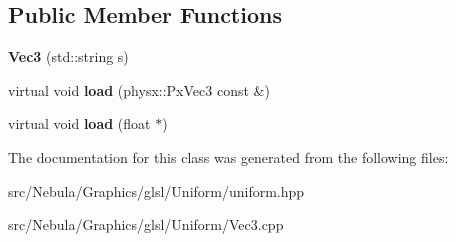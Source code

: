 \subsection*{\-Public \-Member \-Functions}
\begin{DoxyCompactItemize}
\item 
\hypertarget{classNeb_1_1glsl_1_1Uniform_1_1Scalar_1_1Vec3_a00e17308113063b4413ea425ddf975ad}{{\bfseries \-Vec3} (std\-::string s)}\label{classNeb_1_1glsl_1_1Uniform_1_1Scalar_1_1Vec3_a00e17308113063b4413ea425ddf975ad}

\item 
\hypertarget{classNeb_1_1glsl_1_1Uniform_1_1Scalar_1_1Vec3_a5713aa74fb8e57849ce10f0f9ecf51b2}{virtual void {\bfseries load} (physx\-::\-Px\-Vec3 const \&)}\label{classNeb_1_1glsl_1_1Uniform_1_1Scalar_1_1Vec3_a5713aa74fb8e57849ce10f0f9ecf51b2}

\item 
\hypertarget{classNeb_1_1glsl_1_1Uniform_1_1Scalar_1_1Vec3_a2355fadc4a3d7be8cde7e4dc1f5c9475}{virtual void {\bfseries load} (float $\ast$)}\label{classNeb_1_1glsl_1_1Uniform_1_1Scalar_1_1Vec3_a2355fadc4a3d7be8cde7e4dc1f5c9475}

\end{DoxyCompactItemize}


\-The documentation for this class was generated from the following files\-:\begin{DoxyCompactItemize}
\item 
src/\-Nebula/\-Graphics/glsl/\-Uniform/uniform.\-hpp\item 
src/\-Nebula/\-Graphics/glsl/\-Uniform/\-Vec3.\-cpp\end{DoxyCompactItemize}
